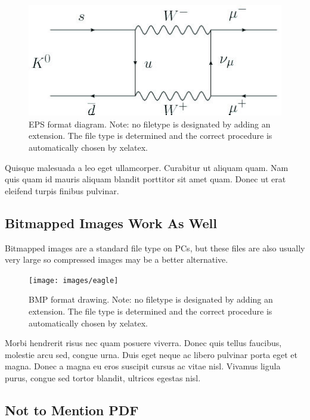 \begin{figure}[htbp]
  \centering
    \includegraphics[width=5in]{images/diagram}
    \caption[EPS format diagram. Note: no filetype is designated by adding an extension.]{EPS format diagram. Note: no filetype is designated by adding an extension. The file type is determined and the correct procedure is automatically chosen by xelatex.}
\end{figure}


Quisque malesuada a leo eget ullamcorper. Curabitur ut aliquam quam. Nam quis quam id mauris aliquam blandit porttitor sit amet quam. Donec ut erat eleifend turpis finibus pulvinar.

\subsection{Bitmapped Images Work As Well}

Bitmapped images are a standard file type on PCs, but these files are also usually very large so compressed images may be a better alternative.

\begin{figure}[htbp]
  \centering
    \texttt{[image: images/eagle]}
    \caption[BMP format drawing. Note: no filetype is designated by adding an extension.]{BMP format drawing. Note: no filetype is designated by adding an extension. The file type is determined and the correct procedure is automatically chosen by xelatex.}
\end{figure}

Morbi hendrerit risus nec quam posuere viverra. Donec quis tellus faucibus, molestie arcu sed, congue urna. Duis eget neque ac libero pulvinar porta eget et magna. Donec a magna eu eros suscipit cursus ac vitae nisl. Vivamus ligula purus, congue sed tortor blandit, ultrices egestas nisl.

\subsection{Not to Mention PDF}

